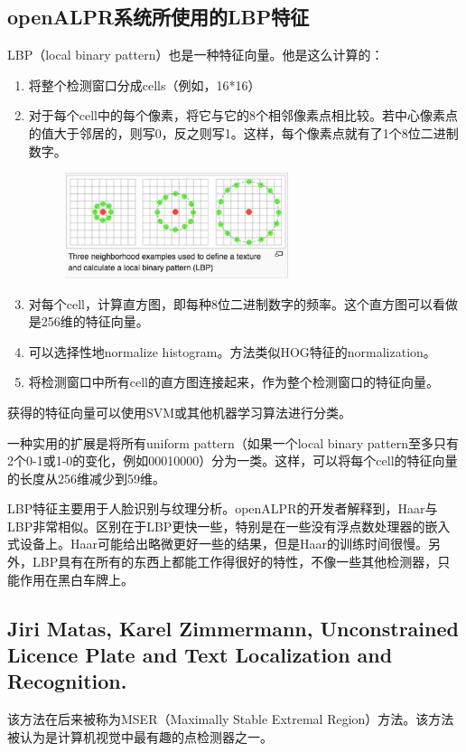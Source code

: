 \subsection{openALPR系统所使用的LBP特征}
LBP（local binary pattern）也是一种特征向量。他是这么计算的：
\begin{enumerate}
\item
将整个检测窗口分成cells（例如，16*16）
\item
对于每个cell中的每个像素，将它与它的8个相邻像素点相比较。若中心像素点的值大于邻居的，则写0，反之则写1。这样，每个像素点就有了1个8位二进制数字。
\begin{figure}[H]
    \centering 
    \includegraphics[width=0.618\textwidth]{image/2_3_1.jpg}    
    \label{logic}
\end{figure}
\item
对每个cell，计算直方图，即每种8位二进制数字的频率。这个直方图可以看做是256维的特征向量。
\item
可以选择性地normalize histogram。方法类似HOG特征的normalization。
\item
将检测窗口中所有cell的直方图连接起来，作为整个检测窗口的特征向量。
\end{enumerate}
获得的特征向量可以使用SVM或其他机器学习算法进行分类。

一种实用的扩展是将所有uniform pattern（如果一个local binary pattern至多只有2个0-1或1-0的变化，例如00010000）分为一类。这样，可以将每个cell的特征向量的长度从256维减少到59维。

LBP特征主要用于人脸识别与纹理分析。openALPR的开发者解释到，Haar与LBP非常相似。区别在于LBP更快一些，特别是在一些没有浮点数处理器的嵌入式设备上。Haar可能给出略微更好一些的结果，但是Haar的训练时间很慢。另外，LBP具有在所有的东西上都能工作得很好的特性，不像一些其他检测器，只能作用在黑白车牌上。
\subsection{Jiri Matas, Karel Zimmermann, Unconstrained Licence Plate and Text Localization and Recognition.}
该方法在后来被称为MSER（Maximally Stable Extremal Region）方法。该方法被认为是计算机视觉中最有趣的点检测器之一。

